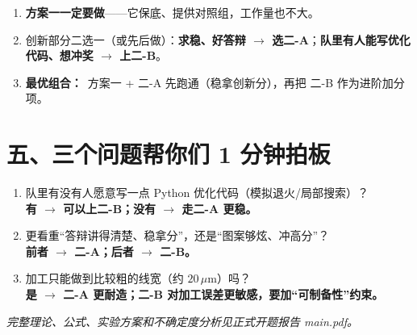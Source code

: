 \documentclass[UTF8,a4paper,11pt]{ctexart}
\begin{document}
\begin{enumerate}[label=\textbf{\arabic*.}]
\item \textbf{方案一一定要做}——它保底、提供对照组，工作量也不大。
\item 创新部分二选一（或先后做）：\textbf{求稳、好答辩 $\rightarrow$ 选二-A}；\textbf{队里有人能写优化代码、想冲奖 $\rightarrow$ 上二-B}。
\item \textbf{最优组合：}\ 方案一 + 二-A 先跑通（稳拿创新分），再把 二-B 作为进阶加分项。
\end{enumerate}

\section*{五、三个问题帮你们 1 分钟拍板}

\begin{enumerate}[label=(\arabic*)]
\item 队里有没有人愿意写一点 Python 优化代码（模拟退火/局部搜索）？\\
\hspace*{1em}\textbf{有 $\rightarrow$ 可以上二-B；没有 $\rightarrow$ 走二-A 更稳。}
\item 更看重“答辩讲得清楚、稳拿分”，还是“图案够炫、冲高分”？\\
\hspace*{1em}\textbf{前者 $\rightarrow$ 二-A；后者 $\rightarrow$ 二-B。}
\item 加工只能做到比较粗的线宽（约 $20\,\mu$m）吗？\\
\hspace*{1em}\textbf{是 $\rightarrow$ 二-A 更耐造；二-B 对加工误差更敏感，要加“可制备性”约束。}
\end{enumerate}

\vspace{0.8em}
\begin{center}
\small\itshape 完整理论、公式、实验方案和不确定度分析见正式开题报告 main.pdf。
\end{center}
\end{document}
